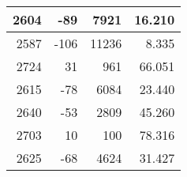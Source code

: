\begin{longtable}{|r|r|r|r|}
		2604                                                                                               & -89                                                    & 7921                                                            & 16.210                                                                                                               \\ \hline
		2587                                                                                               & -106                                                   & 11236                                                           & 8.335                                                                                                                \\ \hline
		2724                                                                                               & 31                                                     & 961                                                             & 66.051                                                                                                               \\ \hline
		2615                                                                                               & -78                                                    & 6084                                                            & 23.440                                                                                                               \\ \hline
		2640                                                                                               & -53                                                    & 2809                                                            & 45.260                                                                                                               \\ \hline
		2703                                                                                               & 10                                                     & 100                                                             & 78.316                                                                                                               \\ \hline
		2625                                                                                               & -68                                                    & 4624                                                            & 31.427                                                                                                               \\ \hline

\end{longtable}
